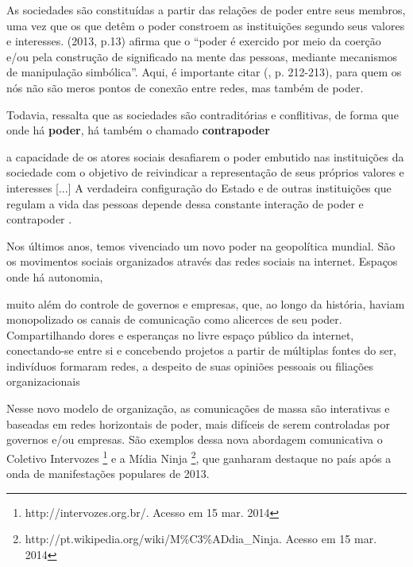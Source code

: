 As sociedades são constituídas a partir das relações de poder entre seus membros, uma vez que os que detêm o poder constroem as instituições segundo seus valores e interesses.  (2013, p.13) afirma que o “poder é exercido por meio da coerção e/ou pela construção de significado na mente das pessoas, mediante mecanismos de manipulação simbólica”.  Aqui, é importante citar  (\citeyear{raffestin1993}, p. 212-213), para quem os nós não são meros pontos de conexão entre redes, mas também de poder.

Todavia,  ressalta que as sociedades são contraditórias e conflitivas, de forma que onde há \textbf{poder}, há também o chamado \textbf{contrapoder}

\begin{citacao}
a capacidade de os atores sociais desafiarem o poder embutido nas instituições da sociedade com o objetivo de reivindicar a representação de seus próprios valores e interesses [...] A verdadeira configuração do Estado e de outras instituições que regulam a vida das pessoas depende dessa constante interação de poder e contrapoder \cite[p .13]{castells2013}.
\end{citacao}

Nos últimos anos, temos vivenciado um novo poder na geopolítica mundial. São os movimentos sociais organizados através das redes sociais na internet. Espaços onde há autonomia,

\begin{citacao}
muito além do controle de governos e empresas, que, ao longo da história, haviam monopolizado os canais de comunicação como alicerces de seu poder. Compartilhando dores e esperanças no livre espaço público da internet, conectando-se entre si e concebendo projetos a partir de múltiplas fontes do ser, indivíduos formaram redes, a despeito de suas opiniões pessoais ou filiações organizacionais \cite[p .10]{castells2013}
\end{citacao}

Nesse novo modelo de organização, as comunicações de massa são interativas e baseadas em redes horizontais de poder, mais difíceis de serem controladas por governos e/ou empresas. São exemplos dessa nova abordagem comunicativa o Coletivo Intervozes \footnote{http://intervozes.org.br/. Acesso em 15 mar. 2014} e a Mídia Ninja \footnote{http://pt.wikipedia.org/wiki/M\%C3\%ADdia\_Ninja. Acesso em 15 mar. 2014}, que ganharam destaque no país após a onda de manifestações populares de 2013.

